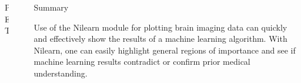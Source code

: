 \documentclass[final]{beamer}
\newlength{\sepwid}
\newlength{\onecolwid}
\newlength{\twocolwid}
\begin{document}
\begin{frame}[t]
\begin{columns}[t]
\begin{column}{\twocolwid}
\begin{columns}[t,totalwidth=\twocolwid]
\begin{column}{\onecolwid}
\begin{block}{PET}
            \end{block}
            
        
        \end{column} %
    
    \end{columns} %
    
    \end{column} %
    
    \begin{column}{\sepwid}\end{column} %
    
    \begin{column}{\onecolwid} %
    
        
    
    \begin{alertblock}{Summary}
    
        Use of the Nilearn module for plotting brain imaging data can quickly and effectively show the results of a machine learning algorithm. With Nilearn, one can easily highlight general regions of importance and see if machine learning results contradict or confirm prior medical understanding.
    
    \end{alertblock} 
    
        
        
        

\end{column}
\end{columns}
\end{frame}
\end{document}
